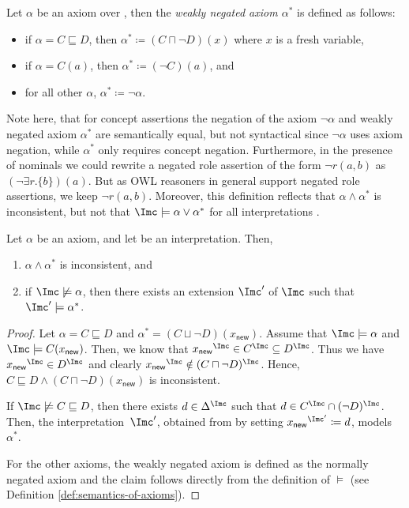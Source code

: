 \begin{definition}
  Let $\alpha$ be an axiom over \Nsig, then the \emph{weakly negated axiom $\alpha^{*}$} is defined
  as follows:
  \begin{itemize}
  \item if $\alpha = C \sqsubseteq D$, then $\alpha^{*} \coloneqq (C \sqcap \lnot D)(x)$ where $x$
    is a fresh variable,
  \item if $\alpha = C(a)$, then $\alpha^{*} \coloneqq (\lnot C)(a)$, and
  \item for all other $\alpha$, $\alpha^{*} \coloneqq \lnot \alpha$. \qedhere
  \end{itemize}
\end{definition}

Note here, that for concept assertions the negation of the axiom $\lnot\alpha$ and weakly negated
axiom $\alpha^{*}$ are semantically equal, but not syntactical since $\lnot\alpha$ uses axiom
negation, while $\alpha^{*}$ only requires concept negation. Furthermore, in the presence of
nominals we could rewrite a negated role assertion of the form $\lnot r(a,b)$ as
$(\lnot\exists r.\{b\})(a)$. But as OWL reasoners in general support negated role assertions, we
keep $\lnot r(a,b)$.  Moreover, this definition reflects that $\alpha\land\alpha^{*}$ is
inconsistent, but not that $\I\models\alpha\lor\alpha^{*}$ for all interpretations \I.

\begin{lemma}\label{lem:weakly-negation-inconsistent}
  Let $\alpha$ be an axiom, and let \I be an interpretation. Then,
  \begin{enumerate}
  \item $\alpha\land\alpha^{*}$ is inconsistent, and
  \item if $\I\not\models\alpha$, then there exists an extension $\I'$ of $\I$ such that $\I'\models\alpha^{*}$.
  \end{enumerate}
\end{lemma}
\begin{proof}
  Let $\alpha = C \sqsubseteq D$ and $\alpha^{*} = (C \sqcup \lnot D)(x_{\mathsf{new}})$. Assume
  that $\I \models \alpha$ and $\I \models C(x_{\mathsf{new}})$.  Then, we know that
  ${x_{\mathsf{new}}}^{\I} \in C^{\I} \subseteq D^{\I}$. Thus we have
  ${x_{\mathsf{new}}}^{\I} \in D^{\I}$ and clearly
  ${x_{\mathsf{new}}}^{\I} \notin (C \sqcap \lnot D)^{\I}$. Hence,
  $C \sqsubseteq D \land (C \sqcap \lnot D)(x_{\mathsf{new}})$ is inconsistent.

  If $\I\not\models C \sqsubseteq D$, then there exists $d\in\Delta^{\I}$ such that
  $d \in C^{\I} \cap (\lnot D)^{\I}$. Then, the interpretation~$\I'$, obtained from \I by setting
  ${x_{\mathsf{new}}}^{\I'} \coloneqq d$, models $\alpha^{*}$.

  For the other axioms, the weakly negated axiom is defined as the normally negated axiom and the
  claim follows directly from the definition of $\models$ (see Definition
  \ref{def:semantics-of-axioms}).
\end{proof}

